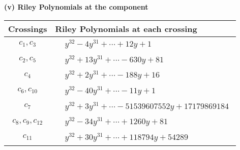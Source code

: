 \documentclass[1p]{elsarticle_modified}
\theoremstyle{definition}
\begin{document}
\flushleft \textbf{(v) Riley Polynomials at the component}\newline \\
\begin{tabular}{m{50pt}|m{274pt}}
Crossings & \hspace{64pt}Riley Polynomials at each crossing \\
\hline $$\begin{aligned}c_{1},c_{3}\end{aligned}$$&$\begin{aligned}
&y^{32}-4 y^{31}+\cdots+12 y+1
\end{aligned}$\\
\hline $$\begin{aligned}c_{2},c_{5}\end{aligned}$$&$\begin{aligned}
&y^{32}+13 y^{31}+\cdots-630 y+81
\end{aligned}$\\
\hline $$\begin{aligned}c_{4}\end{aligned}$$&$\begin{aligned}
&y^{32}+2 y^{31}+\cdots-188 y+16
\end{aligned}$\\
\hline $$\begin{aligned}c_{6},c_{10}\end{aligned}$$&$\begin{aligned}
&y^{32}-40 y^{31}+\cdots-11 y+1
\end{aligned}$\\
\hline $$\begin{aligned}c_{7}\end{aligned}$$&$\begin{aligned}
&y^{32}+3 y^{31}+\cdots-51539607552 y+17179869184
\end{aligned}$\\
\hline $$\begin{aligned}c_{8},c_{9},c_{12}\end{aligned}$$&$\begin{aligned}
&y^{32}-34 y^{31}+\cdots+1260 y+81
\end{aligned}$\\
\hline $$\begin{aligned}c_{11}\end{aligned}$$&$\begin{aligned}
&y^{32}+30 y^{31}+\cdots+118794 y+54289
\end{aligned}$\\
\hline
\end{tabular}\\~\\
\end{document}
